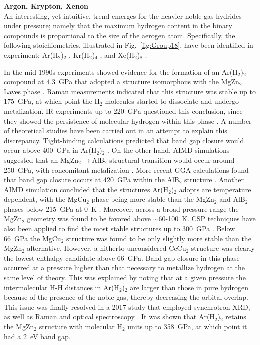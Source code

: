 \documentclass[12pt,letterpaper,oneside]{article}
\begin{document}
\noindent\textbf{Argon, Krypton, Xenon} \\ 
%
An interesting, yet intuitive, trend emerges for the heavier noble gas hydrides under pressure; namely that the maximum hydrogen content in the binary compounds is proportional to the size of the aerogen atom. Specifically, the following stoichiometries, illustrated in Fig.\ \ref{fig:Group18}, have been identified in experiment: Ar(H$_{2}$)$_{2}$ \cite{Loubeyre:1994a, Ji-Ar:2017a}, Kr(H$_{2}$)$_{4}$ \cite{Kleppe:2014a}, and Xe(H$_{2}$)$_{8}$ \cite{Somayazulu:2010a, Somayazulu:2015a}. 

In the mid 1990s experiments showed evidence for the formation of an Ar(H$_2$)$_2$ compound at 4.3~GPa that adopted a structure isomorphous with the MgZn$_2$ Laves phase \cite{Loubeyre:1994a}. Raman measurements indicated that this structure was stable up to 175~GPa, at which point the H$_2$ molecules started to dissociate and undergo metalization. IR experiments up to 220~GPa  questioned this conclusion, since they showed the persistence of molecular hydrogen within this phase \cite{Hemley:2000}. 
A number of theoretical studies have been carried out in an attempt to explain this discrepancy. Tight-binding calculations predicted that band gap closure would occur above 400~GPa in Ar(H$_2$)$_2$ \cite{Chacham:1995a}. On the other hand, AIMD simulations suggested that an MgZn$_2\rightarrow$AlB$_2$ structural transition would occur around 250~GPa, with concomitant metalization \cite{Bernard:1997a}. More recent GGA calculations found that band gap closure occurs at 420~GPa within the AlB$_2$ structure \cite{Matsumoto:2007a}. Another AIMD simulation concluded that the structures Ar(H$_2$)$_2$ adopts are temperature dependent, with the MgCu$_2$ phase being more stable than the MgZn$_2$ and AlB$_2$ phases below 215~GPa at 0~K \cite{Cazorla:2010a}. Moreover, across a broad pressure range the MgZn$_2$ geometry was found to be favored above $\sim$60-100~K. CSP techniques have also been applied to find the most stable structures up to 300~GPa \cite{Yao:2011b}. Below 66~GPa the MgCu$_2$ structure was found to be only slightly more stable than the MgZn$_2$ alternative. However, a hitherto unconsidered CeCu$_2$ structure was clearly the lowest enthalpy candidate above 66~GPa. Band gap closure in this phase occurred at a pressure higher than that necessary to metallize hydrogen at the same level of theory. This was explained by noting that at a given pressure the intermolecular H-H distances in Ar(H$_2$)$_2$ are larger than those in pure hydrogen because of the presence of the noble gas, thereby decreasing the orbital overlap. 
%
This issue was finally resolved in a 2017 study that employed synchrotron XRD, as well as Raman and optical spectroscopy \cite{Ji-Ar:2017a}. It was shown that Ar(H$_2$)$_2$ retains the MgZn$_2$ structure with molecular H$_2$ units up to 358~GPa, at which point it had a 2~eV band gap. 
\end{document}
